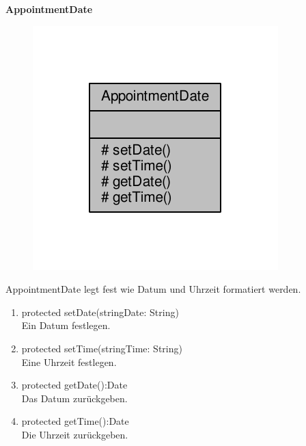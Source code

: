 \textbf{AppointmentDate}
\begin{figure}[H]
	\includegraphics[scale = 1]{res/umlClasses/appointment_date__coll__graph.pdf}
	\centering
\end{figure}
AppointmentDate legt fest wie Datum und Uhrzeit formatiert werden.
\begin{enumerate}
	\item protected setDate(stringDate: String)\\
		Ein Datum festlegen.
	\item protected setTime(stringTime: String)\\
		Eine Uhrzeit festlegen.
	\item protected getDate():Date \\
		Das Datum zurückgeben.
	\item protected getTime():Date \\
		Die Uhrzeit zurückgeben.
\end{enumerate}


